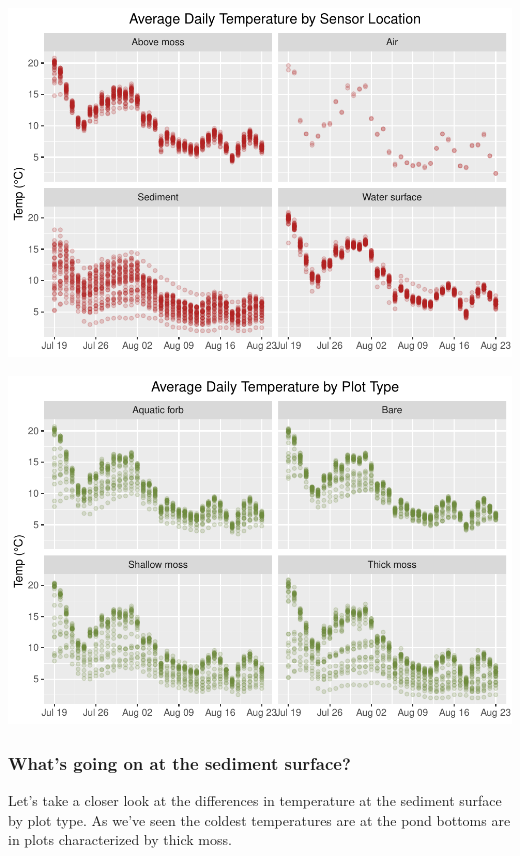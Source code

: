 \documentclass[
]{article}
\begin{document}
\includegraphics{iButtons2022-2-17_files/figure-latex/unnamed-chunk-20-1.pdf}

\includegraphics{iButtons2022-2-17_files/figure-latex/unnamed-chunk-21-1.pdf}

\hypertarget{whats-going-on-at-the-sediment-surface}{%
\subsubsection{What's going on at the sediment
surface?}\label{whats-going-on-at-the-sediment-surface}}

Let's take a closer look at the differences in temperature at the
sediment surface by plot type. As we've seen the coldest temperatures
are at the pond bottoms are in plots characterized by thick moss.
\end{document}
